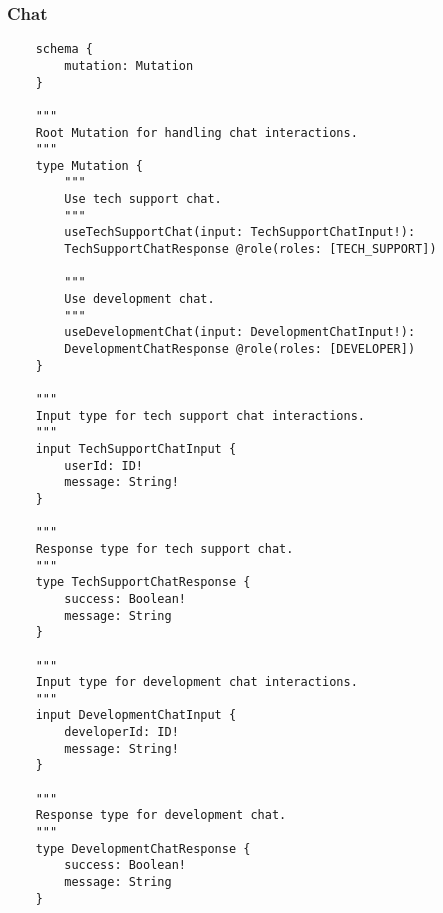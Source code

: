 \subsubsection{Chat}
\begin{verbatim}
	schema {
		mutation: Mutation
	}
	
	"""
	Root Mutation for handling chat interactions.
	"""
	type Mutation {
		"""
		Use tech support chat.
		"""
		useTechSupportChat(input: TechSupportChatInput!): 
		TechSupportChatResponse @role(roles: [TECH_SUPPORT])
		
		"""
		Use development chat.
		"""
		useDevelopmentChat(input: DevelopmentChatInput!): 
		DevelopmentChatResponse @role(roles: [DEVELOPER])
	}
	
	"""
	Input type for tech support chat interactions.
	"""
	input TechSupportChatInput {
		userId: ID!
		message: String!
	}
	
	"""
	Response type for tech support chat.
	"""
	type TechSupportChatResponse {
		success: Boolean!
		message: String
	}
	
	"""
	Input type for development chat interactions.
	"""
	input DevelopmentChatInput {
		developerId: ID!
		message: String!
	}
	
	"""
	Response type for development chat.
	"""
	type DevelopmentChatResponse {
		success: Boolean!
		message: String
	}
\end{verbatim}
